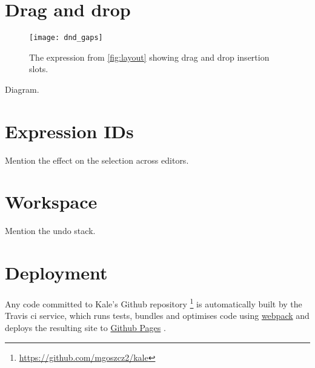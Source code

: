 \section{Drag and drop}
\label{impl:dnd}
\begin{wrapfigure}[6]{r}{0pt}
\texttt{[image: dnd\_gaps]}
\caption{The expression from \autoref{fig:layout} showing drag and drop
insertion slots.}
\end{wrapfigure}
Diagram.




\section{Expression IDs}

Mention the effect on the selection across editors.




\section{Workspace}

Mention the undo stack.




\section{Deployment}
Any code committed to Kale's Github repository%
\footnote{\url{https://github.com/mgoszcz2/kale}}
is automatically built by the Travis \ac{ci} service, which runs tests, bundles
and optimises code using
\href{https://webpack.js.org/}{webpack}
and deploys the resulting site to
\href{https://pages.github.com/}{Github Pages}%
.
